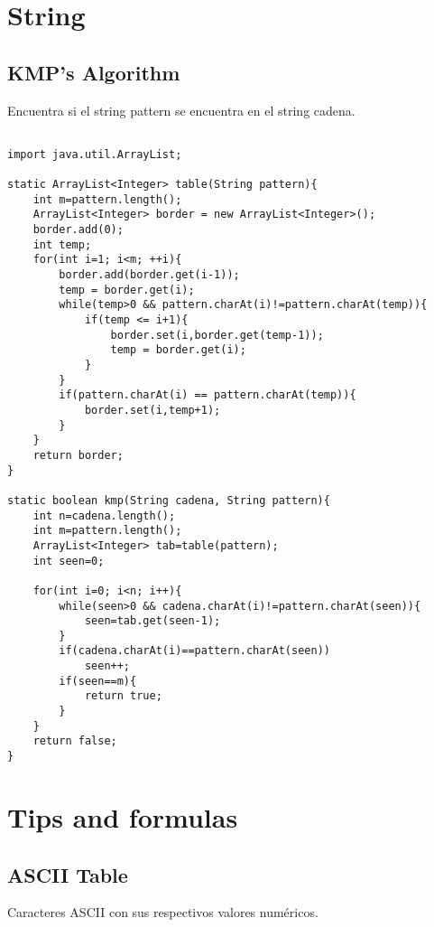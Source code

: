 \documentclass[11pt,letterpaper,twocolumn,twosided]{article}
\begin{document}
\section{String}

\subsection{KMP's Algorithm}
Encuentra si el string pattern se encuentra en el string cadena.

\begin{lstlisting}

import java.util.ArrayList;

static ArrayList<Integer> table(String pattern){
	int m=pattern.length();
	ArrayList<Integer> border = new ArrayList<Integer>();
	border.add(0);
	int temp;
	for(int i=1; i<m; ++i){
		border.add(border.get(i-1));
		temp = border.get(i);
		while(temp>0 && pattern.charAt(i)!=pattern.charAt(temp)){
			if(temp <= i+1){
				border.set(i,border.get(temp-1));
				temp = border.get(i);
			}
		}
		if(pattern.charAt(i) == pattern.charAt(temp)){
			border.set(i,temp+1);
		}
	}
	return border;
}

static boolean kmp(String cadena, String pattern){
	int n=cadena.length();
	int m=pattern.length();
	ArrayList<Integer> tab=table(pattern);
	int seen=0;

	for(int i=0; i<n; i++){
		while(seen>0 && cadena.charAt(i)!=pattern.charAt(seen)){
			seen=tab.get(seen-1);
		}
		if(cadena.charAt(i)==pattern.charAt(seen))
			seen++;
		if(seen==m){
			return true;
		}
	}
	return false;
}
\end{lstlisting}

\section{Tips and formulas}

\subsection{ASCII Table}
Caracteres ASCII con sus respectivos valores num\'ericos.
\end{document}
